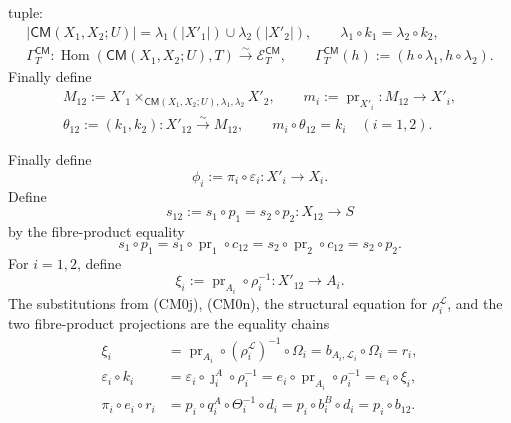 \begin{definition}
\begin{enumerate}
      tuple:
      \[
      \begin{gathered}
        |\mathsf{CM}(X_1,X_2;U)|
          =\lambda_1(|X'_1|)\cup\lambda_2(|X'_2|),\qquad
        \lambda_1\circ k_1=\lambda_2\circ k_2,\\
        \Gamma_T^{\mathsf{CM}}\colon
          \operatorname{Hom}(\mathsf{CM}(X_1,X_2;U),T)
            \xrightarrow{\sim}\mathscr E_T^{\mathsf{CM}},\qquad
        \Gamma_T^{\mathsf{CM}}(h)
          :=(h\circ\lambda_1,h\circ\lambda_2).
      \end{gathered}                                               \tag{CM1e}
      \]
      Finally define
      \[
      \begin{gathered}
        M_{12}:=X'_1\times_{
          \mathsf{CM}(X_1,X_2;U),\lambda_1,\lambda_2}X'_2,
        \qquad
        m_i:=\operatorname{pr}_{X'_i}\colon M_{12}\to X'_i,\\
        \theta_{12}:=(k_1,k_2)
          \colon X'_{12}\xrightarrow{\sim}M_{12},
        \qquad
        m_i\circ\theta_{12}=k_i\quad(i=1,2).
      \end{gathered}                                               \tag{CM1}
      \]
  \end{enumerate}
  Finally define
  \[
    \phi_i:=\pi_i\circ\varepsilon_i\colon X'_i\to X_i.
  \]
  Define
  \[
    s_{12}:=s_1\circ p_1=s_2\circ p_2\colon X_{12}\to S           \tag{CM2a}
  \]
  by the fibre-product equality
  \[
    s_1\circ p_1
      =s_1\circ\operatorname{pr}_1\circ c_{12}
      =s_2\circ\operatorname{pr}_2\circ c_{12}
      =s_2\circ p_2.                                               \tag{CM2b}
  \]
  For \(i=1,2\), define
  \[
    \xi_i:=\operatorname{pr}_{A_i}\circ\rho_i^{-1}
      \colon X'_{12}\to A_i.
  \]
  The substitutions from (CM0j), (CM0n), the structural equation for
  \(\rho_i^{\mathcal L}\), and the two fibre-product projections are the
  equality chains
  \[
  \begin{aligned}
    \xi_i
      &=\operatorname{pr}_{A_i}\circ
          (\rho_i^{\mathcal L})^{-1}\circ\Omega_i
       =b_{A_i,\mathcal L_i}\circ\Omega_i=r_i,\\
    \varepsilon_i\circ k_i
      &=\varepsilon_i\circ\jmath_i^A\circ\rho_i^{-1}
       =e_i\circ\operatorname{pr}_{A_i}\circ\rho_i^{-1}
       =e_i\circ\xi_i,\\
    \pi_i\circ e_i\circ r_i
      &=p_i\circ q_i^A\circ\Theta_i^{-1}\circ d_i
       =p_i\circ b_i^B\circ d_i
       =p_i\circ b_{12}.
  \end{aligned}                                                     \tag{CM2c}
\]
\end{definition}
